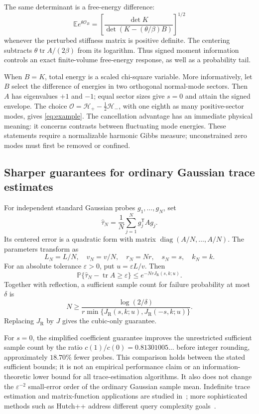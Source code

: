 \documentclass[11pt,letterpaper]{article}
\numberwithin{equation}{section}
\theoremstyle{definition}\newtheorem{definition}[theorem]{Definition}
\theoremstyle{remark}\newtheorem{remark}[theorem]{Remark}
\newcommand{\E}{\mathbb E}
\newcommand{\PP}{\mathbb P}
\newcommand{\tr}{\operatorname{tr}}
\newcommand{\diag}{\operatorname{diag}}
\newcommand{\jRad}{J_{\mathrm R}}
\begin{document}
The same determinant is a free-energy difference:
\begin{equation}
 \E e^{\theta\mathcal O_B}
 =\left[\frac{\det K}{\det(K-(\theta/\beta)B)}\right]^{1/2}
\end{equation}
whenever the perturbed stiffness matrix is positive definite. The
centering subtracts $\theta\tr A/(2\beta)$ from its logarithm.
Thus signed moment information controls an exact finite-volume
free-energy response, as well as a probability tail.

When $B=K$, total energy is a scaled chi-square variable. More
informatively, let $B$ select the difference of energies in two
orthogonal normal-mode sectors. Then $A$ has eigenvalues $+1$ and
$-1$; equal sector sizes give $s=0$ and attain the signed envelope.
The choice $\mathcal O=\mathcal H_+-\frac12\mathcal H_-$, with
one eighth as many positive-sector modes, gives
\eqref{eq:example}. The cancellation advantage has an immediate
physical meaning: it concerns contrasts between fluctuating mode
energies. These statements require a normalizable harmonic Gibbs
measure; unconstrained zero modes must first be removed or confined.

\subsection{Sharper guarantees for ordinary Gaussian trace estimates}
For independent standard Gaussian probes $g_1,\ldots,g_N$, set
\[
 \widehat\tau_N=\frac1N\sum_{j=1}^N g_j^{\mathsf T}Ag_j.
\]
Its centered error is a quadratic form with matrix
$\diag(A/N,\ldots,A/N)$. The parameters transform as
\[
 L_N=L/N,\quad v_N=v/N,\quad r_N=Nr,\quad s_N=s,\quad k_N=k.
\]
For an absolute tolerance $\varepsilon>0$, put
$u=\varepsilon L/v$. Then
\begin{equation}\label{eq:trace}
 \PP\{\widehat\tau_N-\tr A\ge\varepsilon\}
 \le e^{-Nr\jRad(s,k;u)}.
\end{equation}
Together with reflection, a sufficient sample count for failure
probability at most $\delta$ is
\begin{equation}\label{eq:N}
 N\ge\frac{\log(2/\delta)}{
 r\min\{\jRad(s,k;u),\jRad(-s,k;u)\}}.
\end{equation}
Replacing $\jRad$ by $J$ gives the cubic-only guarantee.

For $s=0$, the simplified coefficient guarantee improves the
unrestricted sufficient sample count by the ratio
$c(1)/c(0)=0.81301005\ldots$ before integer rounding, approximately
$18.70\%$ fewer probes. This comparison holds between the stated
sufficient bounds; it is not an empirical performance claim or an
information-theoretic lower bound for all trace-estimation algorithms.
It also does not change the $\varepsilon^{-2}$ small-error order of
the ordinary Gaussian sample mean. Indefinite trace estimation and
matrix-function applications are studied in~\cite{Cortinovis}; more
sophisticated methods such as Hutch++ address different query
complexity goals~\cite{Hutchpp}.
\end{document}
